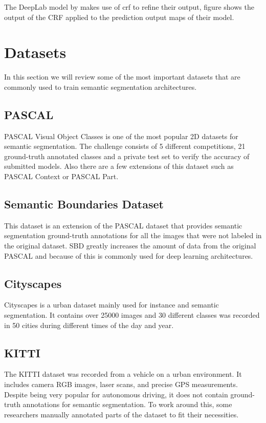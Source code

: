 The DeepLab model by \cite{DBLP:journals/corr/ChenPK0Y16} makes use of \gls{crf} to refine their output, figure  shows the output of the CRF applied to the prediction output maps of their model. 

\section{Datasets}
In this section we will review some of the most important datasets that are commonly used to train semantic segmentation architectures. 

\subsection{PASCAL}
PASCAL Visual Object Classes is one of the most popular 2D datasets for semantic segmentation. The challenge consists of 5 different competitions, 21 ground-truth annotated classes and a private test set to verify the accuracy of submitted models. Also there are a few extensions of this dataset such as PASCAL Context or PASCAL Part.

\subsection{Semantic Boundaries Dataset}
This dataset is an extension of the PASCAL dataset that provides semantic segmentation ground-truth annotations for all the images that were not labeled in the original dataset. SBD greatly increases the amount of data from the original PASCAL and because of this is commonly used for deep learning architectures.

\subsection{Cityscapes}
Cityscapes is a urban dataset mainly used for instance and semantic segmentation. It contains over 25000 images and 30 different classes was recorded in 50 cities during different times of the day and year.

\subsection{KITTI}
The KITTI dataset \cite{Geiger2013IJRR} was recorded from a vehicle on a urban environment. It includes camera RGB images, laser scans, and precise GPS measurements. Despite being very popular for autonomous driving, it does not contain ground-truth annotations for semantic segmentation. To work around this, some researchers manually annotated parts of the dataset to fit their necessities. 
